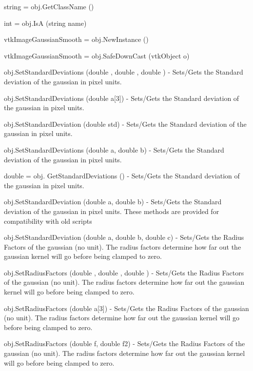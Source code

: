 \begin{DoxyItemize}
\item {\ttfamily string = obj.\-Get\-Class\-Name ()}  
\item {\ttfamily int = obj.\-Is\-A (string name)}  
\item {\ttfamily vtk\-Image\-Gaussian\-Smooth = obj.\-New\-Instance ()}  
\item {\ttfamily vtk\-Image\-Gaussian\-Smooth = obj.\-Safe\-Down\-Cast (vtk\-Object o)}  
\item {\ttfamily obj.\-Set\-Standard\-Deviations (double , double , double )} -\/ Sets/\-Gets the Standard deviation of the gaussian in pixel units.  
\item {\ttfamily obj.\-Set\-Standard\-Deviations (double a\mbox{[}3\mbox{]})} -\/ Sets/\-Gets the Standard deviation of the gaussian in pixel units.  
\item {\ttfamily obj.\-Set\-Standard\-Deviation (double std)} -\/ Sets/\-Gets the Standard deviation of the gaussian in pixel units.  
\item {\ttfamily obj.\-Set\-Standard\-Deviations (double a, double b)} -\/ Sets/\-Gets the Standard deviation of the gaussian in pixel units.  
\item {\ttfamily double = obj. Get\-Standard\-Deviations ()} -\/ Sets/\-Gets the Standard deviation of the gaussian in pixel units.  
\item {\ttfamily obj.\-Set\-Standard\-Deviation (double a, double b)} -\/ Sets/\-Gets the Standard deviation of the gaussian in pixel units. These methods are provided for compatibility with old scripts  
\item {\ttfamily obj.\-Set\-Standard\-Deviation (double a, double b, double c)} -\/ Sets/\-Gets the Radius Factors of the gaussian (no unit). The radius factors determine how far out the gaussian kernel will go before being clamped to zero.  
\item {\ttfamily obj.\-Set\-Radius\-Factors (double , double , double )} -\/ Sets/\-Gets the Radius Factors of the gaussian (no unit). The radius factors determine how far out the gaussian kernel will go before being clamped to zero.  
\item {\ttfamily obj.\-Set\-Radius\-Factors (double a\mbox{[}3\mbox{]})} -\/ Sets/\-Gets the Radius Factors of the gaussian (no unit). The radius factors determine how far out the gaussian kernel will go before being clamped to zero.  
\item {\ttfamily obj.\-Set\-Radius\-Factors (double f, double f2)} -\/ Sets/\-Gets the Radius Factors of the gaussian (no unit). The radius factors determine how far out the gaussian kernel will go before being clamped to zero.  

\end{DoxyItemize}
